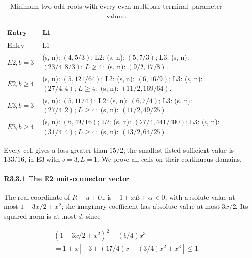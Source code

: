 \begingroup\small
\setlength{\tabcolsep}{3pt}
\setlength{\LTleft}{0pt}\setlength{\LTright}{\fill}
\begin{longtable}{@{}p{0.1200\linewidth}p{0.8000\linewidth}@{}}
\caption{Minimum-two odd roots with every even multipair terminal: parameter values.}\label{tab:parameters:r2-c003:5}\\
\toprule
Entry & L1 \\
\midrule\endfirsthead
\toprule
Entry & L1 \\
\midrule\endhead
\bottomrule\endfoot
\(E2,\allowbreak b=3\) & (s, n): \((4,\allowbreak 5/3)\); L2: (s, n): \((5,\allowbreak 7/3)\); L3: (s, n): \((23/4,\allowbreak 8/3)\); \(L\ge 4:\) (s, n): \((9/2,\allowbreak 17/8)\). \\
\addlinespace[2pt]
\(E2,\allowbreak b\ge 4\) & (s, n): \((5,\allowbreak 121/64)\); L2: (s, n): \((6,\allowbreak 16/9)\); L3: (s, n): \((27/4,\allowbreak 4)\); \(L\ge 4:\) (s, n): \((11/2,\allowbreak 169/64)\). \\
\addlinespace[2pt]
\(E3,\allowbreak b=3\) & (s, n): \((5,\allowbreak 11/4)\); L2: (s, n): \((6,\allowbreak 7/4)\); L3: (s, n): \((27/4,\allowbreak 2)\); \(L\ge 4:\) (s, n): \((11/2,\allowbreak 49/25)\). \\
\addlinespace[2pt]
\(E3,\allowbreak b\ge 4\) & (s, n): \((6,\allowbreak 49/16)\); L2: (s, n): \((27/4,\allowbreak 441/400)\); L3: (s, n): \((31/4,\allowbreak 4)\); \(L\ge 4:\) (s, n): \((13/2,\allowbreak 64/25)\). \\
\end{longtable}
\endgroup


Every cell gives a loss greater than \(15/2\); the smallest listed sufficient value is \(133/16\), in E3 with \(b=3,\allowbreak \allowbreak  L=1\). We prove all cells on their continuous domains.

\paragraph{R3.3.1 The E2 unit-connector vector}

The real coordinate of \(R-u+U_r\) is \(-1+xE+\alpha<0\), with absolute value at most \(1-3x/2+x^2\); the imaginary coefficient has absolute value at most \(3x/2\). Its squared norm is at most \(d\), since

\[
\begin{gathered}
(1-3x/2+x^2)^2+(9/4)x^3\\
=1+x[-3+(17/4)x-(3/4)x^2+x^3]\le 1
\end{gathered}
\]

